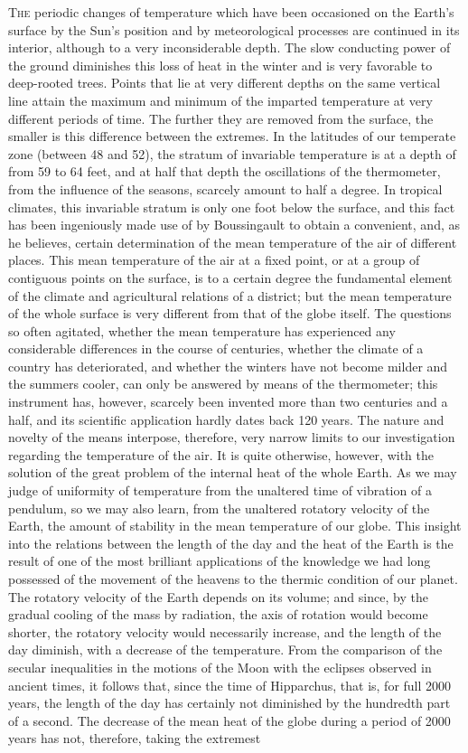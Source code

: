 \lettrine[lines=4]{\goudy T}{he} periodic changes of temperature which have been occasioned on the Earth's surface by the Sun's position and by meteorological processes are continued in its interior, although to a very inconsiderable depth. The slow conducting power of the ground diminishes this loss of heat in the winter and is very favorable to deep-rooted trees. Points that lie at very different depths on the same vertical line attain the maximum and minimum of the imparted temperature at very different periods of time. The further they are removed from the surface, the smaller is this difference between the extremes. In the latitudes of our temperate zone (between 48 and 52), the stratum of invariable temperature is at a depth of from 59 to 64 feet, and at half that depth the oscillations of the thermometer, from the influence of the seasons, scarcely amount to half a degree. In tropical climates, this invariable stratum is only one foot below the surface, and this fact has been ingeniously made use of by Boussingault to obtain a convenient, and, as he believes, certain determination of the mean temperature of the air of different places. This mean temperature of the air at a fixed point, or at a group of contiguous points on the surface, is to a certain degree the fundamental element of the climate and agricultural relations of a district; but the mean temperature of the whole surface is very different from that of the globe itself. The questions so often agitated, whether the mean temperature has experienced any considerable differences in the course of centuries, whether the climate of a country has deteriorated, and whether the winters have not become milder and the summers cooler, can only be answered by means of the thermometer; this instrument has, however, scarcely been invented more than two centuries and a half, and its scientific application hardly dates back 120 years. The nature and novelty of the means interpose, therefore, very narrow limits to our investigation regarding the temperature of the air. It is quite otherwise, however, with the solution of the great problem of the internal heat of the whole Earth. As we may judge of uniformity of temperature from the unaltered time of vibration of a pendulum, so we may also learn, from the unaltered rotatory velocity of the Earth, the amount of stability in the mean temperature of our globe. This insight into the relations between the length of the day and the heat of the Earth is the result of one of the most brilliant applications of the knowledge we had long possessed of the movement of the heavens to the thermic condition of our planet. The rotatory velocity of the Earth depends on its volume; and since, by the gradual cooling of the mass by radiation, the axis of rotation would become shorter, the rotatory velocity would necessarily increase, and the length of the day diminish, with a decrease of the temperature. From the comparison of the secular inequalities in the motions of the Moon with the eclipses observed in ancient times, it follows that, since the time of Hipparchus, that is, for full 2000 years, the length of the day has certainly not diminished by the hundredth part of a second. The decrease of the mean heat of the globe during a period of 2000 years has not, therefore, taking the extremest 